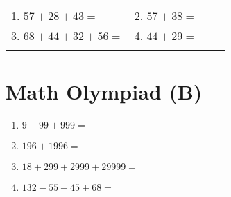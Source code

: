 \documentclass[a4paper,12pt]{article}
\begin{document}
\noindent
\begin{tabularx}{\textwidth}{lX lX}
    \vspace{8cm}
    1. \textbf{\Large $57 + 28 + 43 =$} \underline{\hspace{2cm}} \hspace{3.1cm} & 2. \textbf{\Large $57 + 38 =$} \underline{\hspace{2cm}} \\ 
    \vspace{8cm}
    3. \textbf{\Large $68 + 44 + 32 + 56 =$} \underline{\hspace{2cm}} & 4. \textbf{\Large $44 + 29 =$} \underline{\hspace{2cm}} \\
    \vspace{4cm}
\end{tabularx}


\newpage
\section*{\huge \center\textbf{Math Olympiad (B)}}
\vspace{1 cm}
\begin{multicols}{2}
\begin{enumerate}[label=\arabic*.]
    \item \textbf{\Large $9 + 99 + 999 =$} \underline{\hspace{1cm}} \vspace{8cm}
    \item \textbf{\Large $196 + 1996 =$} \underline{\hspace{1cm}} \vspace{8cm}
    \vfill\null
\columnbreak
    \item \textbf{\Large $18 + 299 + 2999 + 29999 =$} \underline{\hspace{1cm}} \vspace{8cm}
    \item \textbf{\Large $132 - 55 - 45 + 68 =$} \underline{\hspace{1cm}} \vspace{0.5cm}
\end{enumerate}

\end{multicols}
\end{document}
